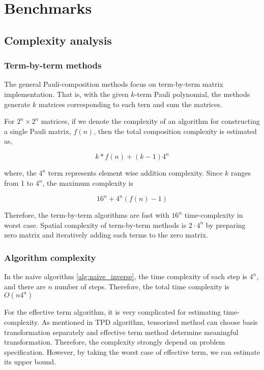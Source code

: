 \documentclass[twocolumn]{article}
\begin{document}
\section{Benchmarks}

\subsection{Complexity analysis}

\subsubsection{Term-by-term methods}

The general Pauli-composition methods focus on 
term-by-term matrix implementation. That is, with the given 
$k$-term Pauli polynomial, the methods generate $k$ matrices corresponding to 
each tern and sum the matrices.

For $2^n \times 2^n$ matrices, if we denote the complexity of an algorithm for constructing a single Pauli matrix,
$f(n)$, then the total composition complexity is estimated as,

\begin{equation}
    \label{eq:k-complexity}
    k * f(n) + (k-1) 4^n
\end{equation}

where, the $4^n$ term represents element wise addition complexity.
Since $k$ ranges from 1 to $4^n$, the maximum complexity is

\begin{equation}
    \label{eq:max_complexity}
    16^n + 4^n(f(n)-1)
\end{equation}

Therefore, the term-by-term algorithms are fast with $16^n$ time-complexity in worst case.
Spatial complexity of term-by-term methods is $2 \cdot 4^n$ by preparing 
zero matrix and iteratively adding each terms to the zero matrix.

\subsubsection{Algorithm complexity}

In the naive algorithm \ref{alg:naive_inverse},
the time complexity of each step is $4^n$, and there are $n$ 
number of steps. 
Therefore, the total time complexity is $O(n4^n)$

For the effective term algorithm,
it is very complicated for estimating time-complexity.
As mentioned in TPD algorithm, tensorized method can 
choose basis transformation separately\cite{Hantzko_2024}
and effective term method determine meaningful transformation.
Therefore, the complexity strongly depend on problem specification.
However, by taking the worst case of effective term, we can estimate its upper bound.
\end{document}
